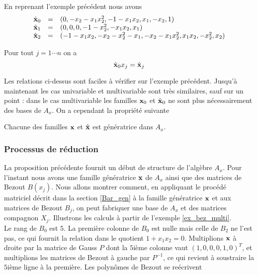 \documentclass{standalone}
\begin{document}
\begin{exmp}
En reprenant l'exemple précédent nous avons
\begin{equation}
	\begin{array}{lll}
		\hat{\bold{x}}_0 & = & (0, -x_2 - x_1x_2^2, -1 - x_1x_2, x_1, -x_2, 1) \\
		\hat{\bold{x}}_1 & = & (0, 0, 0, -1 - x_2^2, -x_1x_2, x_1) \\
		\hat{\bold{x}}_2 & = & (-1 - x_1x_2, -x_2 - x_2^2 - x_1, - x_2 - x_1x_2^2, x_1x_2, -x_2^2, x_2)
	\end{array}
\end{equation}
\end{exmp}

\begin{prop}
\label{xj}
Pour tout $j=1\cdots n$ on a
\begin{equation}
    \hat{\bold{x}}_0x_j = \hat{\bold{x}}_j
\end{equation}
\end{prop}

Les relations ci-dessus sont faciles à vérifier sur l'exemple précédent. Jusqu'à maintenant les cas univariable et multivariable sont très similaires, sauf sur un point : dans le cas multivariable les familles $\bold{x}_0$ et $\hat{\bold{x}}_0$ ne sont plus nécessairement des bases de $A_x$. On a cependant la propriété suivante

\begin{prop}
Chacune des familles $\bold{x}$ et $\hat{\bold{x}}$ est génératrice dans $A_x$.
\end{prop}





\subsubsection{Processus de réduction}
La proposition précédente fournit un début de structure de l'algèbre $A_x$. Pour l'instant nous avons une famille génératrice $\bold{x}$ de $A_x$ ainsi que des matrices de Bezout $B(x_j)$.
Nous allons montrer comment, en appliquant le procédé matriciel décrit dans la section \ref{Bar_gen} à la famille génératrice $\bold{x}$ et aux matrices de Bezout $B_j$, on peut fabriquer une base de $A_x$ et des matrices compagnon $X_j$.
Illustrons les calculs à partir de l'exemple \ref{ex_bez_multi}.\\
Le rang de $B_0$ est $5$. La première colonne de $B_0$ est nulle mais celle de $B_2$ ne l'est pas, ce qui fournit la relation dans le quotient $1 + x_1x_2 = 0$.
Multiplions $\bold{x}$ à droite par la matrice de Gauss $P$ dont la $5$ième colonne vaut $(1, 0, 0, 0, 1, 0)^{T}$, et multiplions les matrices de Bezout à gauche par $P^{-1}$, ce qui revient à soustraire la $5$ième ligne à la première.
Les polynômes de Bezout se reécrivent\\
\end{document}
